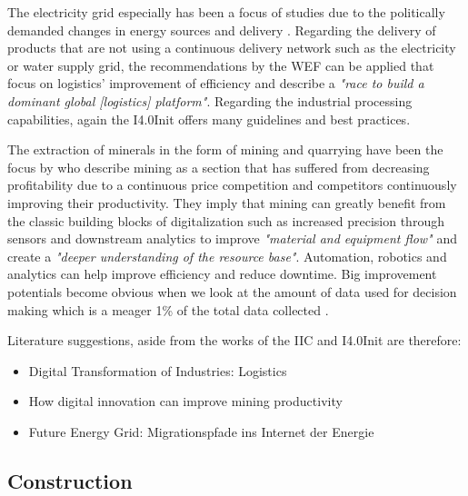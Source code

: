 The electricity grid especially has been a focus of studies due to the politically demanded changes in energy sources and delivery \cite[p.12ff]{AppelrathKagermannMayer2012}. Regarding the delivery of products that are not using a continuous delivery network such as the electricity or water supply grid, the recommendations by the \ac{WEF} can be applied that focus on logistics' improvement of efficiency and describe a \emph{"race to build a dominant global [logistics] platform"}\cite{worldforumlogistics:2016}. Regarding the industrial processing capabilities, again the \acf{I4.0Init} offers many guidelines and best practices.

The extraction of minerals in the form of mining and quarrying have been the focus by \citeauthor{mckinseymining:2015} who describe mining as a section that has suffered from decreasing profitability due to a continuous price competition and competitors continuously improving their productivity. They imply that mining can greatly benefit from the classic building blocks of digitalization such as increased precision through sensors and downstream analytics to improve \emph{"material and equipment flow"} and create a \emph{"deeper understanding of the resource base"}. Automation, robotics and analytics can help improve efficiency and reduce downtime. Big improvement potentials become obvious when we look at the amount of data used for decision making which is a meager 1\% of the total data collected \cite[p.7]{mckinseymining:2015}.

Literature suggestions, aside from the works of the \ac{IIC} and \ac{I4.0Init} are therefore:

\begin{itemize}
\item Digital Transformation of Industries: Logistics \cite{worldforumlogistics:2016}
\item How digital innovation can improve mining productivity \cite{mckinseymining:2015}
\item Future Energy Grid: Migrationspfade ins Internet der Energie \cite{AppelrathKagermannMayer2012}
\end{itemize}


\subsection{Construction}

